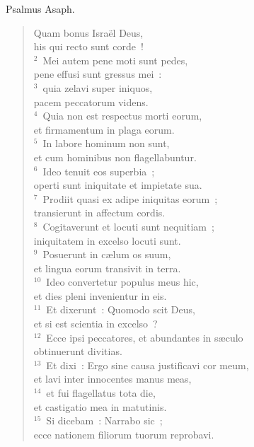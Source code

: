 \lettrine[lines=3,image=true,loversize=0.05,lraise=-0.03]{P}{}salmus Asaph. \begin{flushleft}\begin{verse}\vspace{6pt}Quam bonus Isra\"el Deus,\\ his qui recto sunt corde~!\\
${}^{2}$~Mei autem pene moti sunt pedes,\\ pene effusi sunt gressus mei~:\\
${}^{3}$~quia zelavi super iniquos,\\ pacem peccatorum videns.\\
${}^{4}$~Quia non est respectus morti eorum,\\ et firmamentum in plaga eorum.\\
${}^{5}$~In labore hominum non sunt,\\ et cum hominibus non flagellabuntur.\\
${}^{6}$~Ideo tenuit eos superbia~;\\ operti sunt iniquitate et impietate sua.\\
${}^{7}$~Prodiit quasi ex adipe iniquitas eorum~;\\ transierunt in affectum cordis.\\
${}^{8}$~Cogitaverunt et locuti sunt nequitiam~;\\ iniquitatem in excelso locuti sunt.\\
${}^{9}$~Posuerunt in c\ae lum os suum,\\ et lingua eorum transivit in terra.\\
${}^{10}$~Ideo convertetur populus meus hic,\\ et dies pleni invenientur in eis.\\
${}^{11}$~Et dixerunt~: Quomodo scit Deus,\\ et si est scientia in excelso~?\\
${}^{12}$~Ecce ipsi peccatores, et abundantes in s\ae culo\\ obtinuerunt divitias.\\
${}^{13}$~Et dixi~: Ergo sine causa justificavi cor meum,\\ et lavi inter innocentes manus meas,\\
${}^{14}$~et fui flagellatus tota die,\\ et castigatio mea in matutinis.\\
${}^{15}$~Si dicebam~: Narrabo sic~;\\ ecce nationem filiorum tuorum reprobavi.\\

\end{verse}
\end{flushleft}
